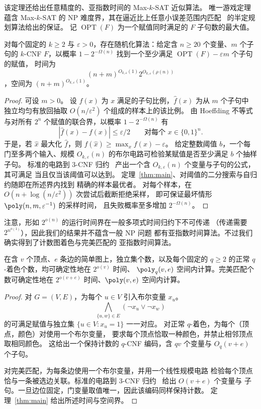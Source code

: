 该定理还给出任意精度的、亚指数时间的 Max-$k$-SAT 近似算法。
唯一游戏定理~\cite[Section~8.1]{OpenAIUGC26} 蕴含 Max-$k$-SAT
的 NP 难度界，其在逼近比上任意小误差范围内匹配~\cite{Rag08}
的半定规划算法给出的保证。
记 $\operatorname{OPT}(F)$ 为一个赋值同时满足的 $F$ 子句数的最大值。
\begin{corollary}\label{cor:max-sat-approximation}
对每个固定的 $k\ge2$ 与 $\varepsilon>0$，存在随机化算法：给定含
$n\ge20$ 个变量、$m$ 个子句的 $k$-CNF $F$，以概率
$1-2^{-\Omega(n)}$ 找到一个至少满足
$\operatorname{OPT}(F)-\varepsilon m$ 个子句的赋值，
时间为
\[
 (n+m)^{O_{k,\varepsilon}(1)}2^{O_{k,\varepsilon}(\rho(n))}
\]
，空间为 $(n+m)^{O_{k,\varepsilon}(1)}$。
\end{corollary}
\begin{proof}
可设 $m>0$。
设 $f(x)$ 为 $x$ 满足的子句比例，$\widehat f(x)$ 为从 $m$ 个子句中
独立均匀有放回抽取 $O(n/\varepsilon^2)$ 个组成的样本上的该比例。
由 Hoeffding 不等式与对所有 $2^n$ 个赋值的联合界，以概率
$1-2^{-\Omega(n)}$ 有
\[
 |\widehat f(x)-f(x)|\le\varepsilon/2
 \qquad\text{对每个 }x\in\{0,1\}^n.
\]
于是，若 $\widehat x$ 最大化 $\widehat f$，则
$f(\widehat x)\ge\max_x f(x)-\varepsilon$。
给定整数阈值 $b$，一个每门至多两个输入、规模
$O_{k,\varepsilon}(n)$ 的布尔电路可检验某赋值是否至少满足 $b$
个抽样子句。
标准的电路到 $3$-CNF 归约~\cite[Lemmas~15.9--15.10]{Bar23}
产出一个含 $O_{k,\varepsilon}(n)$ 个变量与子句的公式，其可满足
当且仅当该阈值可以达到。
定理~\ref{thm:main}、对阈值的二分搜索与自归约随即在所述界内找到
精确的样本最优者。
对每个样本，在 $O(n+\log(n/\varepsilon^2))$ 次尝试后截断拒绝采样，
即可保证最坏情形 $\poly(n,m,\varepsilon^{-1})$ 的采样时间，
且失败概率至多增加 $2^{-\Omega(n)}$。
\end{proof}

注意，形如 $2^{o(n)}$ 的运行时间界在一般多项式时间归约下不可传递
（传递需要 $2^{n^{o(1)}}$），因此我们的结果并不蕴含一般 NP 问题
都有亚指数时间算法。不过我们确实得到了计数图着色与完美匹配的
亚指数时间算法。

\begin{corollary}\label{cor:graph-counting}
在含 $v$ 个顶点、$e$ 条边的简单图上，独立集个数，以及每个固定的
$q\ge2$ 的正常 $q$-着色个数，均可确定性地在 $2^{o(v)}$ 时间、
$\poly_q(v,e)$ 空间内计算。完美匹配个数可确定性地在 $2^{o(v+e)}$
时间、$\poly(v,e)$ 空间内计算。
\end{corollary}
\begin{proof}
对 $G=(V,E)$，为每个 $u\in V$ 引入布尔变量 $x_u$。
\[
 \bigwedge_{\{u,w\}\in E}(\neg x_u\vee\neg x_w)
\]
的可满足赋值与独立集 $\{u\in V:x_u=1\}$ 一一对应。
对正常 $q$-着色，为每个（顶点，颜色）对使用一个布尔变量，
要求每个顶点恰取一种颜色，并禁止相邻顶点取相同颜色。
这给出一个保持计数的 $q$-CNF 编码，含 $qv$ 个变量与
$O_q(v+e)$ 个子句。

对完美匹配，为每条边使用一个布尔变量，并用一个线性规模电路
检验每个顶点恰与一条被选边关联。标准的电路到 $3$-CNF
归约~\cite[Lemmas~15.9--15.10]{Bar23} 给出 $O(v+e)$ 个变量与
子句。一旦边位固定，门变量取值唯一，因此该编码同样保持计数。
定理~\ref{thm:main} 给出所述时间与空间界。
\end{proof}

